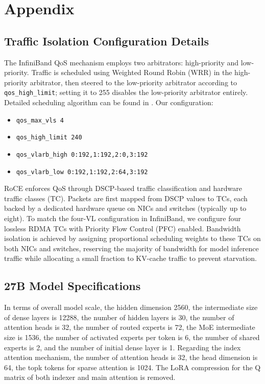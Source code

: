 \section{Appendix}

\subsection{Traffic Isolation Configuration Details}
\label{sec:traffic-isolation-config}

The InfiniBand QoS mechanism employs two arbitrators: high-priority and low-priority.
Traffic is scheduled using Weighted Round Robin (WRR) in the high-priority arbitrator, then steered to the low-priority arbitrator according to \texttt{qos\_high\_limit}; setting it to 255 disables the low-priority arbitrator entirely.
Detailed scheduling algorithm can be found in \cite{ibta-spec}.
Our configuration:
\begin{itemize}[noitemsep]
\item \texttt{qos\_max\_vls 4}
\item \texttt{qos\_high\_limit 240}
\item \texttt{qos\_vlarb\_high 0:192,1:192,2:0,3:192}
\item \texttt{qos\_vlarb\_low 0:192,1:192,2:64,3:192}
\end{itemize}


RoCE enforces QoS through DSCP-based traffic classification and hardware traffic classes (TC). Packets are first mapped from DSCP values to TCs, each backed by a dedicated hardware queue on NICs and switches (typically up to eight). To match the four-VL configuration in InfiniBand, we configure four lossless RDMA TCs with Priority Flow Control (PFC) enabled. Bandwidth isolation is achieved by assigning proportional scheduling weights to these TCs on both NICs and switches, reserving the majority of bandwidth for model inference traffic while allocating a small fraction to KV-cache traffic to prevent starvation.


\subsection{27B Model Specifications}
\label{sec:27b-model-specs}

In terms of overall model scale, 
the hidden dimension 2560,
the intermediate size of dense layers is 12288,
the number of hidden layers is 30,
the number of attention heads is 32,
the number of routed experts is 72,
the MoE intermediate size is 1536,
the number of activated experts per token is 6, 
the number of shared experts is 2, 
and the number of initial dense layer is 1.
Regarding the index attention mechanism, 
the number of attention heads is 32,
the head dimension is 64, 
the topk tokens for sparse attention is 1024.
The LoRA compression for the Q matrix of both indexer and main attention is removed.


